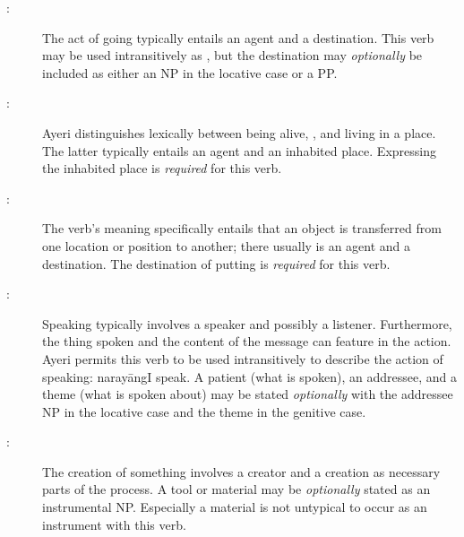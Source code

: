 \begin{description}
	\item[:] The act of going typically entails an
	agent and a destination. This verb may be used intransitively as
	, but the destination may \emph{optionally}
	be included as either an NP in the locative case or a PP.

	\item[:] Ayeri distinguishes
	lexically between being alive, , and living in a place.
	The latter typically entails an agent and an inhabited place. Expressing
	the inhabited place is \emph{required} for this verb.

	\item[:] The verb's meaning specifically
	entails that an object is transferred from one location or position to
	another; there usually is an agent and a destination. The destination of
	putting is \emph{required} for this verb.

	\item[:] Speaking typically involves
	a speaker and possibly a listener. Furthermore, the thing spoken and the
	content of the message can feature in the action. Ayeri permits this verb
	to be used intransitively to describe the action of speaking:
	 {narayāng}{I speak}. A patient (what is spoken), an
	addressee, and a theme (what is spoken about) may be stated
	\emph{optionally} with the addressee NP in the locative case and the theme
	in the genitive case.

	\item[:] The creation of something involves
	a creator and a creation as necessary parts of the process. A tool or
	material may be \emph{optionally} stated as an instrumental NP. Especially
	a material is not untypical to occur as an instrument with this verb.
\end{description}

